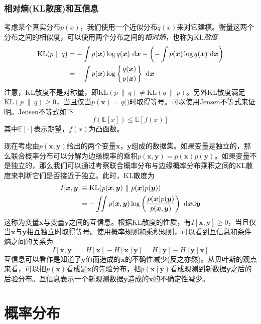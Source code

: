 \documentclass[11pt]{ctexbook}
\begin{document}
\subsection{相对熵(KL散度)和互信息}
考虑某个真实分布$p(x)$，我们使用一个近似分布$q(x)$来对它建模。衡量这两个分布之间的相似度，可以使用两个分布之间的\emph{相对熵}，也称为KL\emph{散度}
\begin{align}
	\mathrm{KL}(p\ \|\ q) &= -\int p(\bm x)\log q(\bm x)\ \mathrm{d}\bm x -\left( -\int p(\bm x)\log q(\bm x)\ \mathrm{d}\bm x \right) \notag \\
						& = -\int p(\bm x)\log \left\{ \frac{q(\bm x)}{p(\bm x)} \right\}\ \mathrm{d}\bm x
\end{align}
注意，KL散度不是对称量，即$\mathrm{KL}(p\ \|\ q) \neq \mathrm{KL}(q\ \|\ p)$。另外KL散度满足$\mathrm{KL}(p\ \|\ q) \geq 0$，当且仅当$p(\bm x) = q(\bm)$时取得等号。可以使用Jensen不等式来证明。Jensen不等式如下
\begin{equation}
	f(\mathbb E[x]) \leq \mathbb E[f(x)]
\end{equation}
其中$\mathbb E[\cdot]$表示期望，$f(x)$为凸函数。


现在考虑由$p(\bm x, \bm y)$给出的两个变量$\bm x$，$\bm y$组成的数据集。如果变量是独立的，那么联合概率分布可以分解为边缘概率的乘积$p(\bm x, \bm y) = p(\bm x)p(\bm y)$。如果变量不是独立的，那么我们可以通过考察联合概率分布与边缘概率分布乘积之间的KL散度来判断它们是否接近于独立。此时，KL散度为
\begin{align}
	I[\bm x, \bm y] &\equiv \mathrm{KL}(p(\bm x, \bm y)\ \|\ p(\bm x)p(\bm y)) \notag \\
	&= -\iint p(\bm x, \bm y) \log \left(\frac{p(\bm x)p(\bm y)}{p(\bm x, \bm y)} \right) \ \mathrm{d}\bm x\mathrm{d}\bm y
\end{align}
这称为变量$\bm x$与变量$\bm y$之间的互信息。根据KL散度的性质，有$I[\bm x, \bm y] \geq 0$，当且仅当$\bm x$与$\bm y$相互独立时取得等号。使用概率规则和乘积规则，可以看到互信息和条件熵之间的关系为
\begin{equation}
	I[\bm x, \bm y] = H[\bm x] - H[\bm x\ |\ \bm y] = H[\bm y] - H[\bm y\ |\ \bm x]
\end{equation}
互信息可以看作是知道了$\bm y$值而造成的$\bm x$的不确性减少(反之亦然)。从贝叶斯的观点来看，可以把$p(\bm x)$看成是$\bm x$的先验分布，把$p(\bm x\ |\ \bm y)$看成观测到新数据$\bm y$之后的后验分布。互信息表示一个新观测数据$\bm y$造成的$\bm x$的不确定性减少。
\chapter{概率分布}
\end{document}
